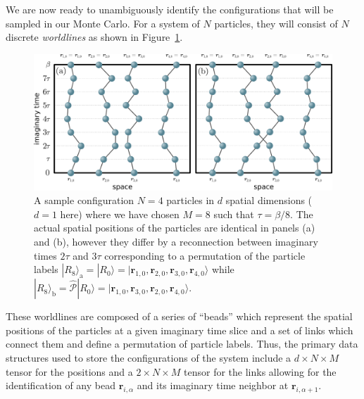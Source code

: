 \documentclass[prb,10pt,aps,floatfix,notitlepage]{revtex4-1}
\renewcommand{\vec}[1]{\boldsymbol{#1}}
\begin{document}
We are now ready to unambiguously identify the configurations that will be
sampled in our Monte Carlo. For a system of $N$ particles, they will consist of
$N$ discrete \emph{worldlines} as shown in Figure~\ref{fig:config}. 
%
\begin{figure}
\begin{center}
\includegraphics[width=0.75\columnwidth]{Figures/worldlines.pdf}
\end{center}
\caption{A sample configuration $N=4$ particles in $d$ spatial dimensions ($d=1$
here) where we have chosen $M=8$ such that $\tau = \beta/8$. The actual
spatial positions of the particles are identical in panels (a) and (b),
however they differ by a reconnection between imaginary times $2\tau$ and $3\tau$
corresponding to a permutation of the particle labels $|R_8\rangle_\mathrm{a} =
|R_0\rangle = |\vec{r}_{1,0},\vec{r}_{2,0},\vec{r}_{3,0},\vec{r}_{4,0}\rangle$
while $|R_8\rangle_\mathrm{b} =
\hat{\mathcal{P}}|R_0\rangle =
|\vec{r}_{1,0},\vec{r}_{3,0},\vec{r}_{2,0},\vec{r}_{4,0}\rangle$.}
\label{fig:config}
 \end{figure}
%
These worldlines are composed of a series of ``beads'' which represent the
spatial positions of the particles at a given imaginary time slice and a set of
links which connect them and define a permutation of particle labels.  Thus,
the primary data structures used to store the configurations of the system
include a $d \times N \times M$ tensor for the positions and a $2 \times N
\times M$ tensor for the links allowing for the identification of any bead
$\vec{r}_{i,\alpha}$ and its imaginary time neighbor at $\vec{r}_{i,\alpha+1}$.
\end{document}
